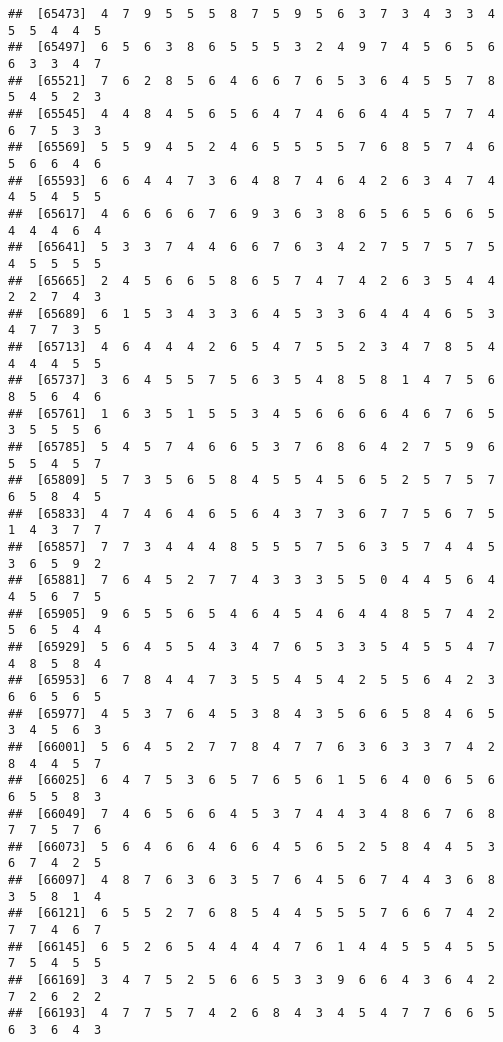 \documentclass[
]{book}
\begin{document}
\begin{verbatim}
##  [65473]  4  7  9  5  5  5  8  7  5  9  5  6  3  7  3  4  3  3  4  5  5  4  4  5
##  [65497]  6  5  6  3  8  6  5  5  5  3  2  4  9  7  4  5  6  5  6  6  3  3  4  7
##  [65521]  7  6  2  8  5  6  4  6  6  7  6  5  3  6  4  5  5  7  8  5  4  5  2  3
##  [65545]  4  4  8  4  5  6  5  6  4  7  4  6  6  4  4  5  7  7  4  6  7  5  3  3
##  [65569]  5  5  9  4  5  2  4  6  5  5  5  5  7  6  8  5  7  4  6  5  6  6  4  6
##  [65593]  6  6  4  4  7  3  6  4  8  7  4  6  4  2  6  3  4  7  4  4  5  4  5  5
##  [65617]  4  6  6  6  6  7  6  9  3  6  3  8  6  5  6  5  6  6  5  4  4  4  6  4
##  [65641]  5  3  3  7  4  4  6  6  7  6  3  4  2  7  5  7  5  7  5  4  5  5  5  5
##  [65665]  2  4  5  6  6  5  8  6  5  7  4  7  4  2  6  3  5  4  4  2  2  7  4  3
##  [65689]  6  1  5  3  4  3  3  6  4  5  3  3  6  4  4  4  6  5  3  4  7  7  3  5
##  [65713]  4  6  4  4  4  2  6  5  4  7  5  5  2  3  4  7  8  5  4  4  4  4  5  5
##  [65737]  3  6  4  5  5  7  5  6  3  5  4  8  5  8  1  4  7  5  6  8  5  6  4  6
##  [65761]  1  6  3  5  1  5  5  3  4  5  6  6  6  6  4  6  7  6  5  3  5  5  5  6
##  [65785]  5  4  5  7  4  6  6  5  3  7  6  8  6  4  2  7  5  9  6  5  5  4  5  7
##  [65809]  5  7  3  5  6  5  8  4  5  5  4  5  6  5  2  5  7  5  7  6  5  8  4  5
##  [65833]  4  7  4  6  4  6  5  6  4  3  7  3  6  7  7  5  6  7  5  1  4  3  7  7
##  [65857]  7  7  3  4  4  4  8  5  5  5  7  5  6  3  5  7  4  4  5  3  6  5  9  2
##  [65881]  7  6  4  5  2  7  7  4  3  3  3  5  5  0  4  4  5  6  4  4  5  6  7  5
##  [65905]  9  6  5  5  6  5  4  6  4  5  4  6  4  4  8  5  7  4  2  5  6  5  4  4
##  [65929]  5  6  4  5  5  4  3  4  7  6  5  3  3  5  4  5  5  4  7  4  8  5  8  4
##  [65953]  6  7  8  4  4  7  3  5  5  4  5  4  2  5  5  6  4  2  3  6  6  5  6  5
##  [65977]  4  5  3  7  6  4  5  3  8  4  3  5  6  6  5  8  4  6  5  3  4  5  6  3
##  [66001]  5  6  4  5  2  7  7  8  4  7  7  6  3  6  3  3  7  4  2  8  4  4  5  7
##  [66025]  6  4  7  5  3  6  5  7  6  5  6  1  5  6  4  0  6  5  6  6  5  5  8  3
##  [66049]  7  4  6  5  6  6  4  5  3  7  4  4  3  4  8  6  7  6  8  7  7  5  7  6
##  [66073]  5  6  4  6  6  4  6  6  4  5  6  5  2  5  8  4  4  5  3  6  7  4  2  5
##  [66097]  4  8  7  6  3  6  3  5  7  6  4  5  6  7  4  4  3  6  8  3  5  8  1  4
##  [66121]  6  5  5  2  7  6  8  5  4  4  5  5  5  7  6  6  7  4  2  7  7  4  6  7
##  [66145]  6  5  2  6  5  4  4  4  4  7  6  1  4  4  5  5  4  5  5  7  5  4  5  5
##  [66169]  3  4  7  5  2  5  6  6  5  3  3  9  6  6  4  3  6  4  2  7  2  6  2  2
##  [66193]  4  7  7  5  7  4  2  6  8  4  3  4  5  4  7  7  6  6  5  6  3  6  4  3

\end{verbatim}
\end{document}
